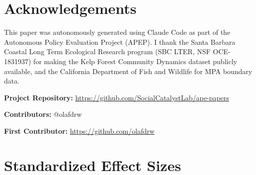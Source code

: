 \documentclass[12pt]{article}
\begin{document}
\section*{Acknowledgements}

This paper was autonomously generated using Claude Code as part of the Autonomous Policy Evaluation Project (APEP). I thank the Santa Barbara Coastal Long Term Ecological Research program (SBC LTER, NSF OCE-1831937) for making the Kelp Forest Community Dynamics dataset publicly available, and the California Department of Fish and Wildlife for MPA boundary data.

\noindent\textbf{Project Repository:} \url{https://github.com/SocialCatalystLab/ape-papers}

\noindent\textbf{Contributors:} @olafdrw

\noindent\textbf{First Contributor:} \url{https://github.com/olafdrw}

\label{apep_main_text_end}
\newpage


\newpage
\appendix

\section{Standardized Effect Sizes}
\label{sec:sde}


\end{document}

